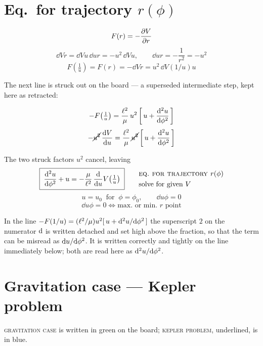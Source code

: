\documentclass[11pt]{article}
\begin{document}
\section*{Eq.\ for trajectory \texorpdfstring{$r(\phi)$}{r(phi)}}

\[
F(r) = -\frac{\partial V}{\partial r}
\]
\[
\dd{V}{r} = \dd{V}{u}\,\dd{u}{r} = -u^{2}\,\dd{V}{u},
\qquad
\dd{u}{r} = -\frac{1}{r^{2}} = -u^{2}
\]
\[
F\!\left(\tfrac{1}{u}\right) = F(r) = -\dd{V}{r} = u^{2}\,\dd{V(1/u)}{u}
\]

\noindent The next line is struck out on the board --- a superseded intermediate
step, kept here as retracted:
\begin{center}
\retractednote
\end{center}

\[
-F\!\left(\tfrac{1}{u}\right)
 = \frac{\ell^{2}}{\mu}\,u^{2}\left[\,u + \frac{\mathrm{d}^{2} u}{\mathrm{d} \phi^{2}}\,\right]
\]
\[
-\cancel{u^{2}}\,\frac{\mathrm{d} V}{\mathrm{d} u}
 = \frac{\ell^{2}}{\mu}\,\cancel{u^{2}}\left[\,u + \frac{\mathrm{d}^{2} u}{\mathrm{d} \phi^{2}}\,\right]
\]

\noindent The two struck factors $u^{2}$ cancel, leaving
\[
\boxed{\;
\frac{\mathrm{d}^{2} u}{\mathrm{d} \phi^{2}} + u = -\frac{\mu}{\ell^{2}}\,\frac{\mathrm{d} }{\mathrm{d} u}V\!\left(\tfrac{1}{u}\right)
\;}
\qquad
\begin{aligned}
&\textsc{eq.\ for trajectory } r(\phi)\\
&\text{solve for given } V
\end{aligned}
\]
\[
u = u_{0}\ \text{ for }\ \phi = \phi_{0},
\qquad
\dd{u}{\phi} = 0
\]
\[
\dd{u}{\phi} = 0 \iff \text{max.\ or min.\ } r \text{ point}
\]

\begin{remark}
In the line $-F(1/u) = (\ell^{2}/\mu)u^{2}[\,u + \mathrm{d}^{2}u/\mathrm{d}\phi^{2}\,]$ the
superscript $2$ on the numerator $\mathrm{d}$ is written detached and set high above the
fraction, so that the term can be misread as $\mathrm{d} u/\mathrm{d}\phi^{2}$. It is written
correctly and tightly on the line immediately below; both are read here as
$\mathrm{d}^{2}u/\mathrm{d}\phi^{2}$.
\end{remark}

\section*{Gravitation case --- Kepler problem}

\begin{remark}[ink]
\textsc{gravitation case} is written in green on the board; \textsc{kepler
problem}, underlined, is in blue.
\end{remark}
\end{document}

